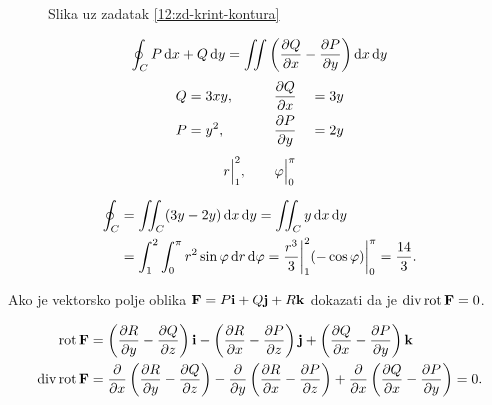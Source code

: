 \begin{center}
	\begin{minipage}[t]{0.48\textwidth}
		\begin{figure}[H]
			\centering
			\caption{Slika uz zadatak \ref{12:zd-krint-kontura}}
			\label{12:slika-krint-kontura}
		\end{figure}
	\end{minipage}
	\begin{minipage}[t]{0.48\textwidth}
		\[
			\oint_C P\dd{x} + Q\dd{y} = \iint \left( \pdv{Q}{x} - \pdv{P}{y}  \right) \dd{x} \dd{y}
		\]
		\begin{alignat*}{3}
			Q & = 3xy, \qquad &  & \pdv{Q}{{x}} &  & = 3y \\
			P & = y^2, \qquad &  & \pdv{P}{{y}} &  & = 2y
		\end{alignat*}
		\[
			r\Big|_1^{2}, \qquad \varphi\Big|_0^{\pi}
		\]
	\end{minipage}
\end{center}

\begin{alignat*}{1}
	\oint_C & = \iint_C (3y-2y) \dd{x} \dd{y} = \iint_C y \dd{x} \dd{y} \\
	        & = \int_{1}^{2} \int_{0}^{\pi} r^2 \sin\varphi \dd{r} \dd{\varphi}
	= \frac{r^3}{3} \bigg|_1^{2} (- \cos \varphi) \bigg|_0^{\pi} = \frac{14}{3}
	.\end{alignat*}

\begin{zadatak}
	Ako je vektorsko polje oblika $\vb{F} = P \vb{i} + Q \vb{j} + R \vb{k}$ dokazati da je $\operatorname{div} \operatorname{rot} \vb{F} = 0$.
\end{zadatak}

$$\begin{aligned}
	\operatorname{rot} \vb{F}       & =	\left( \pdv{R}{y} - \pdv{Q}{z}  \right) \vb{i} -
	\left( \pdv{R}{x} - \pdv{P}{z}  \right) \vb{j} +
	\left( \pdv{Q}{x} - \pdv{P}{y}  \right) \vb{k}\\
	\operatorname{div} \operatorname{rot} \vb{F} & =	\pdv{}{x} \left( \pdv{R}{y} - \pdv{Q}{z} \right) -
	\pdv{}{y} \left( \pdv{R}{x} - \pdv{P}{z} \right) +
	\pdv{}{x} \left( \pdv{Q}{x} - \pdv{P}{y} \right) = 0
	.\end{aligned}$$


